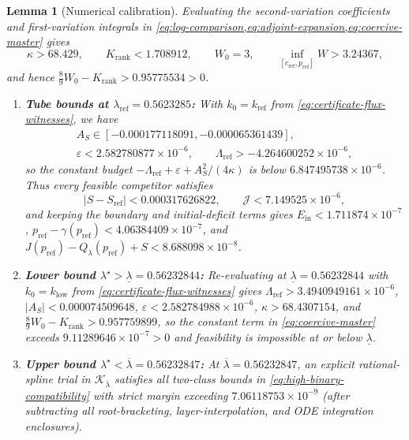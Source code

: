 \documentclass[11pt]{article}
\numberwithin{equation}{section}
\theoremstyle{plain}
\newtheorem{lemma}[theorem]{Lemma}
\theoremstyle{definition}
\newcommand{\1}{\mathbf{1}}
\newcommand{\calJ}{\mathcal{J}}
\newcommand{\calK}{\mathcal{K}}
\begin{document}
\begin{lemma}[Numerical calibration]
\label{lem:numerical-calibration}
Evaluating the second-variation coefficients and first-variation integrals in \cref{eq:log-comparison,eq:adjoint-expansion,eq:coercive-master} gives
\[
  \kappa > 68.429, \qquad K_{\mathrm{rank}} < 1.708912, \qquad W_0 = 3, \qquad \inf_{[c_{\mathrm{ref}}, p_{\mathrm{ref}}]} W > 3.24367,
\]
and hence $\frac{8}{9}W_0 - K_{\mathrm{rank}} > 0.95775534 > 0$.
\begin{enumerate}[label=(\roman*)]
  \item \textbf{Tube bounds at $\lambda_{\mathrm{ref}} = 0.5623285$:} With $k_0 = k_{\mathrm{ref}}$ from \cref{eq:certificate-flux-witnesses}, we have
  \[
    \begin{gathered}
      A_S \in [-0.000177118091, -0.000065361439], \\
      \varepsilon < 2.582780877 \times 10^{-6}, \qquad \Lambda_{\mathrm{ref}} > -4.264600252 \times 10^{-6},
    \end{gathered}
  \]
  so the constant budget $-\Lambda_{\mathrm{ref}} + \varepsilon + A_S^2/(4\kappa)$ is below $6.847495738 \times 10^{-6}$. Thus every feasible competitor satisfies
  \[
    |S - S_{\mathrm{ref}}| < 0.000317626822, \qquad \calJ < 7.149525 \times 10^{-6},
  \]
  and keeping the boundary and initial-deficit terms gives $E_{\mathrm{in}} < 1.711874 \times 10^{-7}$, $p_{\mathrm{ref}} - \gamma(p_{\mathrm{ref}}) < 4.06384409 \times 10^{-7}$, and $J(p_{\mathrm{ref}}) - Q_\lambda(p_{\mathrm{ref}}) + S < 8.688098 \times 10^{-8}$.
  \item \textbf{Lower bound $\lambda^\star > \underline{\lambda} = 0.56232844$:} Re-evaluating at $\underline{\lambda} = 0.56232844$ with $k_0 = k_{\mathrm{low}}$ from \cref{eq:certificate-flux-witnesses} gives $\Lambda_{\mathrm{ref}} > 3.4940949161 \times 10^{-6}$, $|A_S| < 0.000074509648$, $\varepsilon < 2.582784988 \times 10^{-6}$, $\kappa > 68.4307154$, and $\frac{8}{9}W_0 - K_{\mathrm{rank}} > 0.957759899$, so the constant term in \cref{eq:coercive-master} exceeds $9.11289646 \times 10^{-7} > 0$ and feasibility is impossible at or below $\underline{\lambda}$.
  \item \textbf{Upper bound $\lambda^\star < \overline{\lambda} = 0.56232847$:} At $\overline{\lambda} = 0.56232847$, an explicit rational-spline trial in $\calK_{\overline{\lambda}}$ satisfies all two-class bounds in \cref{eq:high-binary-compatibility} with strict margin exceeding $7.06118753 \times 10^{-9}$ (after subtracting all root-bracketing, layer-interpolation, and ODE integration enclosures).
\end{enumerate}
\end{lemma}
\end{document}
